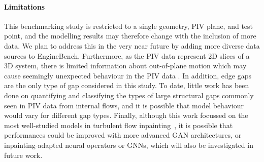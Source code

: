 \documentclass{article}
\begin{document}
\paragraph{Limitations}
This benchmarking study is restricted to a single geometry, PIV plane, and test point, and the modelling results may therefore change with the inclusion of more data. We plan to address this in the very near future by adding more diverse data sources to EngineBench. Furthermore, as the PIV data represent 2D slices of a 3D system, there is limited information about out-of-plane motion which may cause seemingly unexpected behaviour in the PIV data \cite{wieneke2015piv}. 
In addition, edge gaps are the only type of gap considered in this study. 
To date, little work has been
done on quantifying and classifying the types of large structural gaps commonly seen in PIV data from internal flows, and it is possible that model behaviour would vary for different gap types. Finally, although this work focussed on the most well-studied models in turbulent flow inpainting~\cite{li2023multi}, it is possible that performances could be improved with more advanced GAN architectures, or inpainting-adapted neural operators or GNNs, which will also be investigated in future work. 
\end{document}
